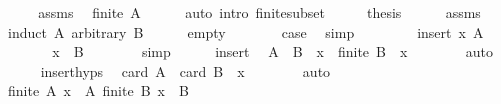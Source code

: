 \begin{isabellebody}
%
\isadelimproof
%
\endisadelimproof
%
\isatagproof
{}\isamarkupfalse%
\ {\isacharminus}{\kern0pt}\isanewline
\ \ \isamarkupfalse%
\ assms\ \isamarkupfalse%
\ {\isachardoublequoteopen}finite\ A{\isachardoublequoteclose}\isanewline
\ \ \ \ \isamarkupfalse%
\ {\isacharparenleft}{\kern0pt}auto\ intro{\isacharcolon}{\kern0pt}\ finite{\isacharunderscore}{\kern0pt}subset{\isacharparenright}{\kern0pt}\isanewline
\ \ \isamarkupfalse%
\ \isamarkupfalse%
\ {\isacharquery}{\kern0pt}thesis\isanewline
\ \ \ \ \isamarkupfalse%
\ assms\isanewline
\ \ \isamarkupfalse%
\ {\isacharparenleft}{\kern0pt}induct\ A\ arbitrary{\isacharcolon}{\kern0pt}\ B{\isacharparenright}{\kern0pt}\isanewline
\ \ \ \ \isamarkupfalse%
\ empty\isanewline
\ \ \ \ \isamarkupfalse%
\ \isamarkupfalse%
\ {\isacharquery}{\kern0pt}case\ \isamarkupfalse%
\ simp\isanewline
\ \ \isamarkupfalse%
\isanewline
\ \ \ \ \isamarkupfalse%
\ {\isacharparenleft}{\kern0pt}insert\ x\ A{\isacharparenright}{\kern0pt}\isanewline
\ \ \ \ \isamarkupfalse%
\ \isamarkupfalse%
\ {\isachardoublequoteopen}x\ {\isasymin}\ B{\isachardoublequoteclose}\isanewline
\ \ \ \ \ \ \isamarkupfalse%
\ simp\isanewline
\ \ \ \ \isamarkupfalse%
\ insert\ \isamarkupfalse%
\ {\isachardoublequoteopen}A\ {\isasymsubseteq}\ B\ {\isacharminus}{\kern0pt}\ {\isacharbraceleft}{\kern0pt}x{\isacharbraceright}{\kern0pt}{\isachardoublequoteclose}\ \ {\isachardoublequoteopen}finite\ {\isacharparenleft}{\kern0pt}B\ {\isacharminus}{\kern0pt}\ {\isacharbraceleft}{\kern0pt}x{\isacharbraceright}{\kern0pt}{\isacharparenright}{\kern0pt}{\isachardoublequoteclose}\isanewline
\ \ \ \ \ \ \isamarkupfalse%
\ auto\isanewline
\ \ \ \ \isamarkupfalse%
\ insert{\isachardot}{\kern0pt}hyps\ \isamarkupfalse%
\ {\isachardoublequoteopen}card\ A\ {\isasymle}\ card\ {\isacharparenleft}{\kern0pt}B\ {\isacharminus}{\kern0pt}\ {\isacharbraceleft}{\kern0pt}x{\isacharbraceright}{\kern0pt}{\isacharparenright}{\kern0pt}{\isachardoublequoteclose}\isanewline
\ \ \ \ \ \ \isamarkupfalse%
\ auto\isanewline
\ \ \ \ \isamarkupfalse%
\ {\isacartoucheopen}finite\ A{\isacartoucheclose}\ {\isacartoucheopen}x\ {\isasymnotin}\ A{\isacartoucheclose}\ {\isacartoucheopen}finite\ B{\isacartoucheclose}\ {\isacartoucheopen}x\ {\isasymin}\ B{\isacartoucheclose}\ \isamarkupfalse%

\end{isabellebody}
